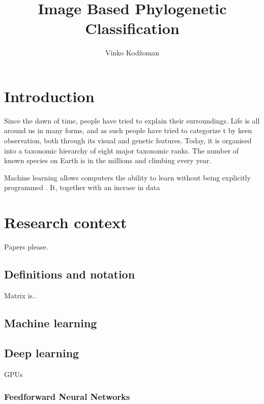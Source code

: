 \documentclass[times, utf8, diplomski]{fer}
\begin{document}
\title{Image Based Phylogenetic Classification}
\author{Vinko Kodžoman}

\maketitle

\izvornik


\tableofcontents

\chapter{Introduction}
Since the dawn of time, people have tried to explain their surroundings. Life is all around us in many forms, and as such people have tried to categorize t by keen observation, both through its visual and genetic features. Today, it is organised into a taxonomic hierarchy of eight major taxonomic ranks. The number of known species on Earth is in the millions and climbing every year. \par
Machine learning allows computers the ability to learn without being explicitly programmed \citep{samuel_studies_1959}. It, together with an incrase in data  

\chapter{Research context}
Papers please.

\section{Definitions and notation}
Matrix is..

\section{Machine learning}

\section{Deep learning}
GPUs

\subsection{Feedforward Neural Networks}
\end{document}
